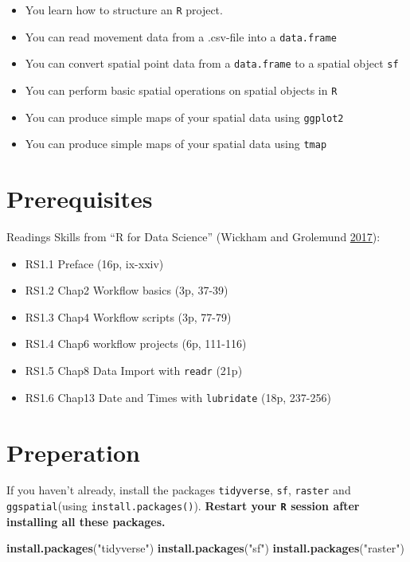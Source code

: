 \documentclass[]{book}
\newenvironment{Shaded}{\begin{snugshade}}{\end{snugshade}}
\newcommand{\KeywordTok}[1]{\textcolor[rgb]{0.13,0.29,0.53}{\textbf{#1}}}
\newcommand{\NormalTok}[1]{#1}
\newcommand{\StringTok}[1]{\textcolor[rgb]{0.31,0.60,0.02}{#1}}
\providecommand{\tightlist}{%
  \setlength{\itemsep}{0pt}\setlength{\parskip}{0pt}}
\begin{document}
\begin{itemize}
\tightlist
\item
  You learn how to structure an \texttt{R} project.
\item
  You can read movement data from a .csv-file into a \texttt{data.frame}
\item
  You can convert spatial point data from a \texttt{data.frame} to a spatial object \texttt{sf}
\item
  You can perform basic spatial operations on spatial objects in \texttt{R}
\item
  You can produce simple maps of your spatial data using \texttt{ggplot2}
\item
  You can produce simple maps of your spatial data using \texttt{tmap}
\end{itemize}

\hypertarget{prerequisites}{%
\section{Prerequisites}\label{prerequisites}}

Readings Skills from ``R for Data Science'' (Wickham and Grolemund \protect\hyperlink{ref-wickham2017}{2017}):

\begin{itemize}
\tightlist
\item
  RS1.1 Preface (16p, ix-xxiv)
\item
  RS1.2 Chap2 Workflow basics (3p, 37-39)
\item
  RS1.3 Chap4 Workflow scripts (3p, 77-79)
\item
  RS1.4 Chap6 workflow projects (6p, 111-116)
\item
  RS1.5 Chap8 Data Import with \texttt{readr} (21p)
\item
  RS1.6 Chap13 Date and Times with \texttt{lubridate} (18p, 237-256)
\end{itemize}

\hypertarget{preperation}{%
\section{Preperation}\label{preperation}}

If you haven't already, install the packages \texttt{tidyverse}, \texttt{sf}, \texttt{raster} and \texttt{ggspatial}(using \texttt{install.packages()}). \textbf{Restart your \texttt{R} session after installing all these packages.}

\begin{Shaded}
\begin{Highlighting}[]
\KeywordTok{install.packages}\NormalTok{(}\StringTok{"tidyverse"}\NormalTok{)}
\KeywordTok{install.packages}\NormalTok{(}\StringTok{"sf"}\NormalTok{)}
\KeywordTok{install.packages}\NormalTok{(}\StringTok{"raster"}\NormalTok{)}
\end{Highlighting}
\end{Shaded}
\end{document}
